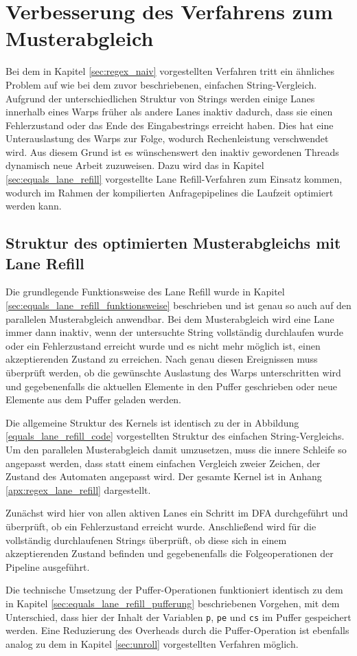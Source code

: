 \chapter{Verbesserung des Verfahrens zum Musterabgleich}

Bei dem in Kapitel \ref{sec:regex_naiv} vorgestellten Verfahren tritt ein ähnliches Problem auf wie bei dem zuvor beschriebenen, einfachen String-Vergleich.
Aufgrund der unterschiedlichen Struktur von Strings werden einige Lanes innerhalb eines Warps früher als andere Lanes inaktiv dadurch, dass sie einen Fehlerzustand oder das Ende des Eingabestrings erreicht haben.
Dies hat eine Unterauslastung des Warps zur Folge, wodurch Rechenleistung verschwendet wird.
Aus diesem Grund ist es wünschenswert den inaktiv gewordenen Threads dynamisch neue Arbeit zuzuweisen.
Dazu wird das in Kapitel \ref{sec:equals_lane_refill} vorgestellte Lane Refill-Verfahren zum Einsatz kommen, wodurch im Rahmen der kompilierten Anfragepipelines die Laufzeit optimiert werden kann.


\section{Struktur des optimierten Musterabgleichs mit Lane Refill}

Die grundlegende Funktionsweise des Lane Refill wurde in Kapitel \ref{sec:equals_lane_refill_funktionsweise} beschrieben und ist genau so auch auf den parallelen Musterabgleich anwendbar.
Bei dem Musterabgleich wird eine Lane immer dann inaktiv, wenn der untersuchte String vollständig durchlaufen wurde oder ein Fehlerzustand erreicht wurde und es nicht mehr möglich ist, einen akzeptierenden Zustand zu erreichen.
Nach genau diesen Ereignissen muss überprüft werden, ob die gewünschte Auslastung des Warps unterschritten wird und gegebenenfalls die aktuellen Elemente in den Puffer geschrieben oder neue Elemente aus dem Puffer geladen werden.

Die allgemeine Struktur des Kernels ist identisch zu der in Abbildung \ref{equals_lane_refill_code} vorgestellten Struktur des einfachen String-Vergleichs.
Um den parallelen Musterabgleich damit umzusetzen, muss die innere Schleife so angepasst werden, dass statt einem einfachen Vergleich zweier Zeichen, der Zustand des Automaten angepasst wird.
Der gesamte Kernel ist in Anhang \ref{apx:regex_lane_refill} dargestellt.

Zunächst wird hier von allen aktiven Lanes ein Schritt im DFA durchgeführt und überprüft, ob ein Fehlerzustand erreicht wurde.
Anschließend wird für die vollständig durchlaufenen Strings überprüft, ob diese sich in einem akzeptierenden Zustand befinden und gegebenenfalls die Folgeoperationen der Pipeline ausgeführt.

Die technische Umsetzung der Puffer-Operationen funktioniert identisch zu dem in Kapitel \ref{sec:equals_lane_refill_pufferung} beschriebenen Vorgehen, mit dem Unterschied, dass hier der Inhalt der Variablen \texttt{p}, \texttt{pe} und \texttt{cs} im Puffer gespeichert werden.
Eine Reduzierung des Overheads durch die Puffer-Operation ist ebenfalls analog zu dem in Kapitel \ref{sec:unroll} vorgestellten Verfahren möglich.